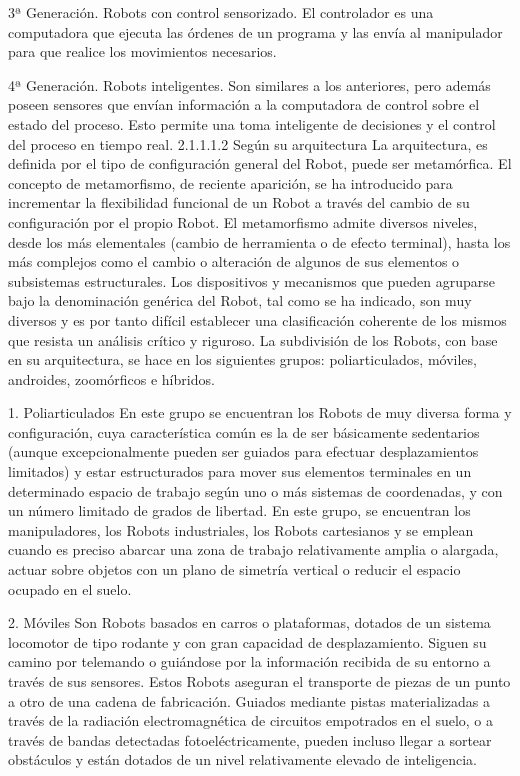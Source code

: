 3ª Generación.
Robots con control sensorizado. El controlador es una computadora que ejecuta las órdenes de un programa y las envía al manipulador para que realice los movimientos necesarios.

4ª Generación.
Robots inteligentes. Son similares a los anteriores, pero además poseen sensores que envían información a la computadora de control sobre el estado del proceso. Esto permite una toma inteligente de decisiones y el control del proceso en tiempo real. 
2.1.1.1.2	Según su arquitectura
La arquitectura, es definida por el tipo de configuración general del Robot, puede ser metamórfica. El concepto de metamorfismo, de reciente aparición, se ha introducido para incrementar la flexibilidad funcional de un Robot a través del cambio de su configuración por el propio Robot.
El metamorfismo admite diversos niveles, desde los más elementales (cambio de herramienta o de efecto terminal), hasta los más complejos como el cambio o alteración de algunos de sus elementos o subsistemas estructurales.
Los dispositivos y mecanismos que pueden agruparse bajo la denominación genérica del Robot, tal como se ha indicado, son muy diversos y es por tanto difícil establecer una clasificación coherente de los mismos que resista un análisis crítico y riguroso. La subdivisión de los Robots, con base en su arquitectura, se hace en los siguientes grupos: poliarticulados, móviles, androides, zoomórficos e híbridos.

1. Poliarticulados
En este grupo se encuentran los Robots de muy diversa forma y configuración, cuya característica común es la de ser básicamente sedentarios (aunque excepcionalmente pueden ser guiados para efectuar desplazamientos limitados) y estar estructurados para mover sus elementos terminales en un determinado espacio de trabajo según uno o más sistemas de coordenadas, y con un número limitado de grados de libertad. En este grupo, se encuentran los manipuladores, los Robots industriales, los Robots cartesianos y se emplean cuando es preciso abarcar una zona de trabajo relativamente amplia o alargada, actuar sobre objetos con un plano de simetría vertical o reducir el espacio ocupado en el suelo.

2. Móviles
Son Robots basados en carros o plataformas, dotados de un sistema locomotor de tipo rodante y con gran capacidad de desplazamiento. Siguen su camino por telemando o guiándose por la información recibida de su entorno a través de sus sensores. Estos Robots aseguran el transporte de piezas de un punto a otro de una cadena de fabricación. Guiados mediante pistas materializadas a través de la radiación electromagnética de circuitos empotrados en el suelo, o a través de bandas detectadas fotoeléctricamente, pueden incluso llegar a sortear obstáculos y están dotados de un nivel relativamente elevado de inteligencia.

